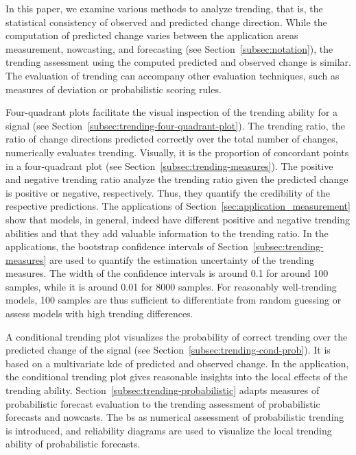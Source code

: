 
In this paper, we examine various methods to analyze trending, that is, the statistical consistency of observed and predicted change direction.
While the computation of predicted change varies between the application areas measurement, nowcasting, and forecasting (see Section~\ref{subsec:notation}), the trending assessment using the computed predicted and observed change is similar.
The evaluation of trending can accompany other evaluation techniques, such as measures of deviation or probabilistic scoring rules.

Four-quadrant plots facilitate the visual inspection of the trending ability for a signal (see Section~\ref{subsec:trending-four-quadrant-plot}).
The trending ratio, the ratio of change directions predicted correctly over the total number of changes, numerically evaluates trending.
Visually, it is the proportion of concordant points in a four-quadrant plot (see Section~\ref{subsec:trending-measures}).
The positive and negative trending ratio analyze the trending ratio given the predicted change is positive or negative, respectively.
Thus, they quantify the credibility of the respective predictions. 
The applications of Section~\ref{sec:application_measurement} show that models, in general, indeed have different positive and negative trending abilities and that they add valuable information to the trending ratio.
In the applications, the bootstrap confidence intervals of Section~\ref{subsec:trending-measures} are used to quantify the estimation uncertainty of the trending measures.
The width of the confidence intervals is around 0.1 for around 100 samples, while it is around 0.01 for 8000 samples.
For reasonably well-trending models, 100 samples are thus sufficient to differentiate from random guessing or assess models with high trending differences.

A conditional trending plot visualizes the probability of correct trending over the predicted change of the signal (see Section~\ref{subsec:trending-cond-prob}).
It is based on a multivariate \acf{kde} of predicted and observed change.
In the application, the conditional trending plot gives reasonable insights into the local effects of the trending ability.
Section~\ref{subsec:trending-probabilistic} adapts measures of probabilistic forecast evaluation to the trending assessment of probabilistic forecasts and nowcasts.
The \acf{bs} as numerical assessment of probabilistic trending is introduced, and reliability diagrams are used to visualize the local trending ability of probabilistic forecasts.

